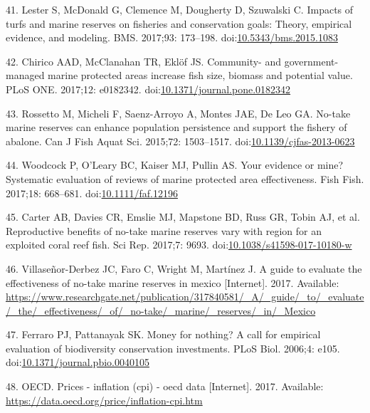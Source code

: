 \documentclass[12pt,]{article}
\begin{document}
\hypertarget{ref-lester_2017-nh}{}
41. Lester S, McDonald G, Clemence M, Dougherty D, Szuwalski C. Impacts
of turfs and marine reserves on fisheries and conservation goals:
Theory, empirical evidence, and modeling. BMS. 2017;93: 173--198.
doi:\href{https://doi.org/10.5343/bms.2015.1083}{10.5343/bms.2015.1083}

\hypertarget{ref-chirico_2017-Rz}{}
42. Chirico AAD, McClanahan TR, Eklöf JS. Community- and
government-managed marine protected areas increase fish size, biomass
and potential value. PLoS ONE. 2017;12: e0182342.
doi:\href{https://doi.org/10.1371/journal.pone.0182342}{10.1371/journal.pone.0182342}

\hypertarget{ref-rossetto_2015-V0}{}
43. Rossetto M, Micheli F, Saenz-Arroyo A, Montes JAE, De Leo GA.
No-take marine reserves can enhance population persistence and support
the fishery of abalone. Can J Fish Aquat Sci. 2015;72: 1503--1517.
doi:\href{https://doi.org/10.1139/cjfas-2013-0623}{10.1139/cjfas-2013-0623}

\hypertarget{ref-woodcock_2017-Wm}{}
44. Woodcock P, O'Leary BC, Kaiser MJ, Pullin AS. Your evidence or mine?
Systematic evaluation of reviews of marine protected area effectiveness.
Fish Fish. 2017;18: 668--681.
doi:\href{https://doi.org/10.1111/faf.12196}{10.1111/faf.12196}

\hypertarget{ref-carter_2017-Uf}{}
45. Carter AB, Davies CR, Emslie MJ, Mapstone BD, Russ GR, Tobin AJ, et
al. Reproductive benefits of no-take marine reserves vary with region
for an exploited coral reef fish. Sci Rep. 2017;7: 9693.
doi:\href{https://doi.org/10.1038/s41598-017-10180-w}{10.1038/s41598-017-10180-w}

\hypertarget{ref-villaseorderbez_website_2017-xE}{}
46. Villaseñor-Derbez JC, Faro C, Wright M, Martínez J. A guide to
evaluate the effectiveness of no-take marine reserves in mexico
{[}Internet{]}. 2017. Available:
\url{https://www.researchgate.net/publication/317840581/_A/_guide/_to/_evaluate/_the/_effectiveness/_of/_no-take/_marine/_reserves/_in/_Mexico}

\hypertarget{ref-ferraro_2006-oW}{}
47. Ferraro PJ, Pattanayak SK. Money for nothing? A call for empirical
evaluation of biodiversity conservation investments. PLoS Biol. 2006;4:
e105.
doi:\href{https://doi.org/10.1371/journal.pbio.0040105}{10.1371/journal.pbio.0040105}

\hypertarget{ref-oecd_website_2017-VV}{}
48. OECD. Prices - inflation (cpi) - oecd data {[}Internet{]}. 2017.
Available: \url{https://data.oecd.org/price/inflation-cpi.htm}
\end{document}
